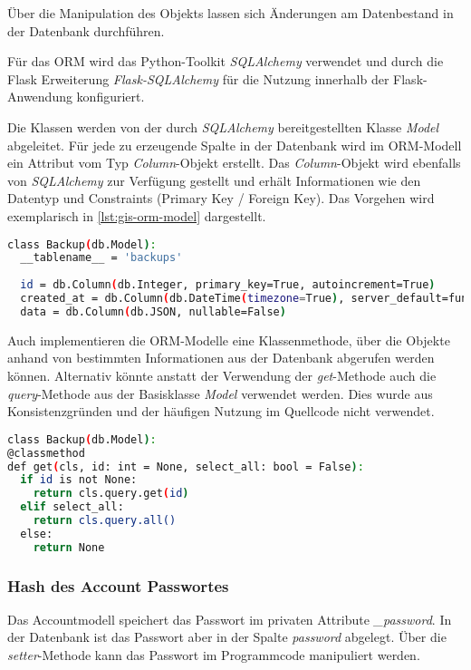 Über die Manipulation des Objekts lassen sich Änderungen am Datenbestand in der Datenbank durchführen. 

Für das ORM wird das Python-Toolkit \textit{SQLAlchemy} verwendet und durch die Flask Erweiterung \textit{Flask-SQLAlchemy} für die Nutzung innerhalb der Flask-Anwendung konfiguriert. 

Die Klassen werden von der durch \textit{SQLAlchemy} bereitgestellten Klasse \textit{Model} abgeleitet. Für jede zu erzeugende Spalte in der Datenbank wird im ORM-Modell ein Attribut vom Typ \linebreak \textit{Column}-Objekt erstellt. Das \textit{Column}-Objekt wird ebenfalls von \textit{SQLAlchemy} zur Verfügung gestellt und erhält Informationen wie den Datentyp und Constraints (Primary Key / Foreign Key).
Das Vorgehen wird exemplarisch in \autoref{lst:gis-orm-model} dargestellt.

\begin{lstlisting}[language=bash, frame=single, caption={GIS Beispiel eines ORM Models}, captionpos=b, label={lst:gis-orm-model}]
class Backup(db.Model):
  __tablename__ = 'backups'
  
  id = db.Column(db.Integer, primary_key=True, autoincrement=True)
  created_at = db.Column(db.DateTime(timezone=True), server_default=func.now(), nullable=False)
  data = db.Column(db.JSON, nullable=False)
\end{lstlisting}

Auch implementieren die ORM-Modelle eine Klassenmethode, über die Objekte anhand von bestimmten Informationen aus der Datenbank abgerufen werden können. Alternativ könnte anstatt der Verwendung der \textit{get}-Methode auch die \textit{query}-Methode aus der Basisklasse \textit{Model} verwendet werden. Dies wurde aus Konsistenzgründen und der häufigen Nutzung im Quellcode nicht verwendet.

\begin{lstlisting}[language=bash, frame=single, caption={GIS Beispiel einer Get-Methode des ORM Models}, captionpos=b, label={lst:gis-orm-model-get}]
class Backup(db.Model):
@classmethod
def get(cls, id: int = None, select_all: bool = False):
  if id is not None:
    return cls.query.get(id)
  elif select_all:
    return cls.query.all()
  else:
    return None
\end{lstlisting}

\subsubsection{Hash des Account Passwortes}
Das Accountmodell speichert das Passwort im privaten Attribute \textit{\_password}. In der Datenbank ist das Passwort aber in der Spalte \textit{password} abgelegt. Über die \textit{setter}-Methode kann das Passwort im Programmcode manipuliert werden.

